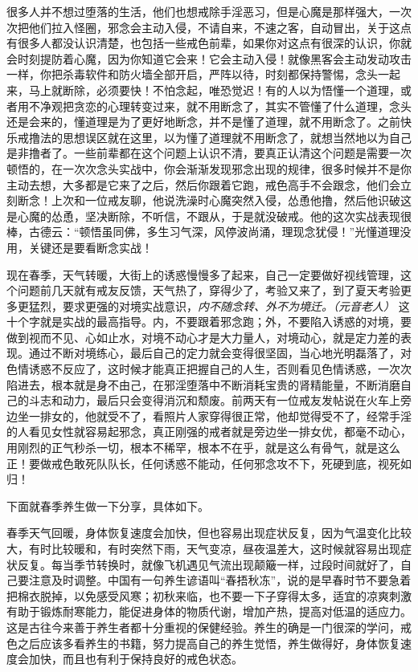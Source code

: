 很多人并不想过堕落的生活，他们也想戒除手淫恶习，但是心魔是那样强大，一次次把他们拉入怪圈，邪念会主动入侵，不请自来，不速之客，自动冒出，关于这点有很多人都没认识清楚，也包括一些戒色前辈，如果你对这点有很深的认识，你就会时刻提防着心魔，因为你知道它会来！它会主动入侵！就像黑客会主动发动攻击一样，你把杀毒软件和防火墙全部开启，严阵以待，时刻都保持警惕，念头一起来，马上就断除，必须要快！不怕念起，唯恐觉迟！有的人以为悟懂一个道理，或者用不净观把贪恋的心理转变过来，就不用断念了，其实不管懂了什么道理，念头还是会来的，懂道理是为了更好地断念，并不是懂了道理，就不用断念了。之前快乐戒撸法的思想误区就在这里，以为懂了道理就不用断念了，就想当然地以为自己是非撸者了。一些前辈都在这个问题上认识不清，要真正认清这个问题是需要一次顿悟的，在一次次念头实战中，你会渐渐发现邪念出现的规律，很多时候并不是你主动去想，大多都是它来了之后，然后你跟着它跑，戒色高手不会跟念，他们会立刻断念！上次和一位戒友聊，他说洗澡时心魔突然入侵，怂恿他撸，然后他识破这是心魔的怂恿，坚决断除，不听信，不跟从，于是就没破戒。他的这次实战表现很棒，古德云：“顿悟虽同佛，多生习气深，风停波尚涌，理现念犹侵！”光懂道理没用，关键还是要看断念实战！

现在春季，天气转暖，大街上的诱惑慢慢多了起来，自己一定要做好视线管理，这个问题前几天就有戒友反馈，天气热了，穿得少了，考验又来了，到了夏天考验更多更猛烈，要求更强的对境实战意识，\textit{内不随念转、外不为境迁。（元音老人）} 这十个字就是实战的最高指导。内，不要跟着邪念跑；外，不要陷入诱惑的对境，要做到视而不见、心如止水，对境不动心才是大力量人，对境动心，就是定力差的表现。通过不断对境练心，最后自己的定力就会变得很坚固，当心地光明磊落了，对色情诱惑不反应了，这时候才能真正把握自己的人生，否则看见色情诱惑，一次次陷进去，根本就是身不由己，在邪淫堕落中不断消耗宝贵的肾精能量，不断消磨自己的斗志和动力，最后只会变得消沉和颓废。前两天有一位戒友发帖说在火车上旁边坐一排女的，他就受不了，看照片人家穿得很正常，他却觉得受不了，经常手淫的人看见女性就容易起邪念，真正刚强的戒者就是旁边坐一排女优，都毫不动心，用刚烈的正气秒杀一切，根本不稀罕，根本不在乎，就是这么有骨气，就是这么正！要做戒色敢死队队长，任何诱惑不能动，任何邪念攻不下，死硬到底，视死如归！

下面就春季养生做一下分享，具体如下。

春季天气回暖，身体恢复速度会加快，但也容易出现症状反复，因为气温变化比较大，有时比较暖和，有时突然下雨，天气变凉，昼夜温差大，这时候就容易出现症状反复。每当季节转换时，就像飞机遇见气流出现颠簸一样，过段时间就好了，自己要注意及时调整。中国有一句养生谚语叫“春捂秋冻”，说的是早春时节不要急着把棉衣脱掉，以免感受风寒；初秋来临，也不要一下子穿得太多，适宜的凉爽刺激有助于锻炼耐寒能力，能促进身体的物质代谢，增加产热，提高对低温的适应力。这是古往今来善于养生者都十分重视的保健经验。养生的确是一门很深的学问，戒色之后应该多看养生的书籍，努力提高自己的养生觉悟，养生做得好，身体恢复速度会加快，而且也有利于保持良好的戒色状态。

